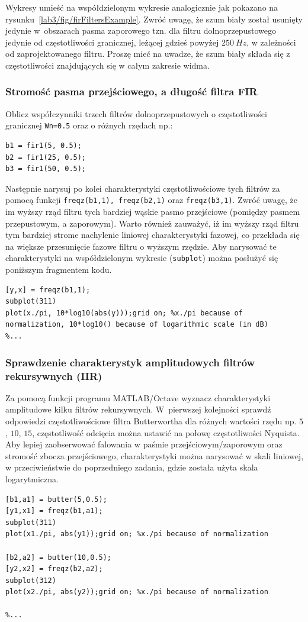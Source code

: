 Wykresy umieść na współdzielonym wykresie analogicznie jak pokazano na rysunku~\ref{lab3/fig/firFiltersExample}. Zwróć uwagę, że szum biały został usunięty jedynie w~obszarach pasma zaporowego tzn. dla filtru dolnoprzepustowego jedynie od częstotliwości granicznej, leżącej gdzieś powyżej $250~Hz$, w zależności od zaprojektowanego filtru. Proszę mieć na uwadze, że szum biały składa się z częstotliwości znajdujących się w całym zakresie widma.



\subsubsection{Stromość pasma przejściowego, a długość filtra FIR}
Oblicz współczynniki trzech filtrów dolnoprzepustowych o częstotliwości granicznej \texttt{Wn=0.5} oraz o różnych rzędach np.: 
\begin{lstlisting}
b1 = fir1(5, 0.5);
b2 = fir1(25, 0.5);
b3 = fir1(50, 0.5);
\end{lstlisting}
Następnie narysuj po kolei charakterystyki częstotliwościowe tych filtrów za pomocą funkcji \texttt{freqz(b1,1), freqz(b2,1)} oraz \texttt{freqz(b3,1)}. Zwróć uwagę, że im wyższy rząd filtru tych bardziej wąskie pasmo przejściowe (pomiędzy pasmem przepustowym, a zaporowym). Warto również zauważyć, iż im wyższy rząd filtru tym bardziej strome nachylenie liniowej charakterystyki fazowej, co przekłada się na większe przesunięcie fazowe filtru o wyższym rzędzie. Aby narysować te charakterystyki na współdzielonym wykresie (\texttt{subplot}) można posłużyć się poniższym fragmentem kodu.
\begin{lstlisting}
[y,x] = freqz(b1,1);
subplot(311)
plot(x./pi, 10*log10(abs(y)));grid on; %x./pi because of normalization, 10*log10() because of logarithmic scale (in dB)
%...
\end{lstlisting}

\subsubsection{Sprawdzenie charakterystyk amplitudowych filtrów rekursywnych (IIR)}
Za pomocą funkcji programu MATLAB/Octave wyznacz charakterystyki amplitudowe kilku filtrów rekursywnych. W~pierwszej kolejności sprawdź odpowiedzi częstotliwościowe filtra Butterwortha dla różnych wartości rzędu np. $5$, $10$, $15$, częstotliwość odcięcia można ustawić na połowę częstotliwości Nyquista. Aby lepiej zaobserwować falowania w paśmie przejściowym/zaporowym oraz stromość zbocza przejściowego, charakterystyki można narysować w skali liniowej, w przeciwieństwie do poprzedniego zadania, gdzie została użyta skala logarytmiczna.
\begin{lstlisting}
[b1,a1] = butter(5,0.5);
[y1,x1] = freqz(b1,a1);
subplot(311)
plot(x1./pi, abs(y1));grid on; %x./pi because of normalization

[b2,a2] = butter(10,0.5);
[y2,x2] = freqz(b2,a2);
subplot(312)
plot(x2./pi, abs(y2));grid on; %x./pi because of normalization

%...
\end{lstlisting}

